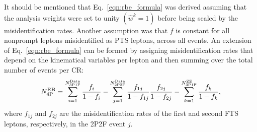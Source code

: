 It should be mentioned that Eq.~\ref{eqn:rbe_formula} was derived assuming that the analysis weights were set to unity $\left( \hat{w}^k = 1 \right)$ before being scaled by the misidentification rates.
Another assumption was that $f$ is constant for all nonprompt leptons misidentified as PTS leptons, across all events.
An extension of Eq.~\ref{eqn:rbe_formula} can be formed by assigning misidentification rates that depend on the kinematical variables per lepton and then summing over the total number of events per CR:
\begin{equation}
	\label{eqn:rbe_formula_final}
	N_{\mathrm{4P}}^{\mathrm{RB}} = \sum_{i=1}^{N_{\mathrm{3P1F}}^\mathrm{Data}} \frac{f_i}{1 - f_i}
	- \sum_{j=1}^{N_{\mathrm{2P2F}}^{\mathrm{Data}}} \frac{f_{1j}}{1 - f_{1j}}\frac{f_{2j}}{1 - f_{2j}}
	- \sum_{k=1}^{N_{\mathrm{3P1F}}^{\mathrm{ZZ}}} \frac{f_k}{1 - f_k},
\end{equation}
where $f_{1j}$ and $f_{2j}$ are the misidentification rates of the first and second FTS leptons, respectively, in the 2P2F event $j$.

